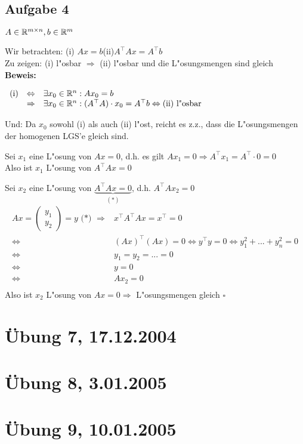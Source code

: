 \documentclass[a4paper,twoside,DIV15,BCOR12mm]{scrbook}
\newcommand{\RA}{\Rightarrow}
\newcommand{\LRA}{\Leftrightarrow}
\newcommand{\x}{\cdot}
\newcommand{\trans}{^\top}
\providecommand{\matr}[1]{\begin{pmatrix}#1\end{pmatrix}}
\newenvironment{bew}{\pagebreak[2]\textbf{Beweis: }}{\qed}
\renewcommand{\qed}{\hspace*{\fill} \ensuremath{\square}}
\begin{document}
\subsection {Aufgabe 4}
$A\in\mathbb{R}^{m\times n}, b\in\mathbb{R}^m$\par
Wir betrachten: (i) $Ax=b$\quad(ii)$A\trans Ax=A\trans b$\\
Zu zeigen: (i) l"osbar $\RA$ (ii) l"osbar und die L"osungsmengen sind gleich
\begin{bew}\par
$\begin{array}{lll}\text{(i)}&\LRA&\exists x_0\in\MdR^n: Ax_0=b\\
&\RA&\exists x_0\in\MdR^n: (A\trans A)\x x_0=A\trans b\LRA\text{(ii) l"osbar}\end{array}$\par
Und: Da $x_0$ sowohl (i) als auch (ii) l"ost, reicht es z.z., dass die L"osungsmengen der homogenen LGS'e gleich sind.\par
Sei $x_1$ eine L"osung von $Ax=0$, d.h. es gilt $Ax_1=0 \RA A\trans x_1=A\trans\x0=0$\\
Also ist $x_1$ L"osung von $A\trans Ax=0$\par
Sei $x_2$ eine L"osung von $\underbrace{A\trans Ax=0}_{(*)}$, d.h. $A\trans Ax_2=0$\\
\[\begin{array}{ll}Ax=\matr{y_1\\y_2}=y\text{ (*) } \RA & x\trans A\trans Ax=x\trans=0\\
\LRA & (Ax)\trans(Ax)=0\LRA y\trans y=0\LRA y_1^2+...+y_n^2=0\\
\LRA & y_1=y_2=...=0\\
\LRA & y=0\\
\LRA & Ax_2=0\\
\end{array}\]
Also ist $x_2$ L"osung von $Ax=0\RA$ L"osungsmengen gleich
\end{bew}


\section {Übung 7, 17.12.2004}

\section {Übung 8, 3.01.2005}

\section {Übung 9, 10.01.2005}
\end{document}
